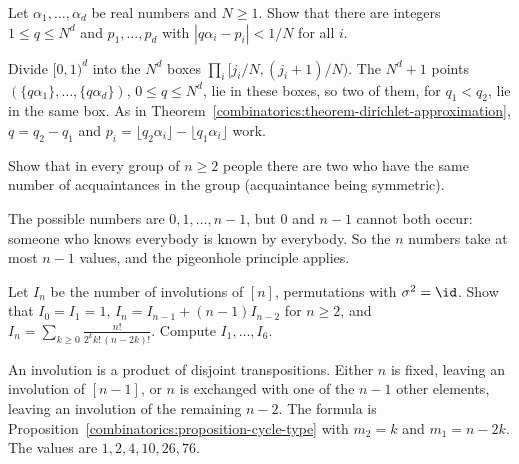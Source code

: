 \begin{exercise}\label{combinatorics:exercise-dirichlet-simultaneous}
Let $\alpha_1, \ldots, \alpha_d$ be real numbers and $N \geq 1$. Show that there are integers $1 \leq q \leq N^d$ and $p_1, \ldots, p_d$ with $|q\alpha_i - p_i| < 1/N$ for all $i$.
\end{exercise}

\begin{solution}
Divide $[0, 1)^d$ into the $N^d$ boxes $\prod_i[j_i/N, (j_i + 1)/N)$. The $N^d + 1$ points $(\{q\alpha_1\}, \ldots, \{q\alpha_d\})$, $0 \leq q \leq N^d$, lie in these boxes, so two of them, for
$q_1 < q_2$, lie in the same box. As in Theorem~\ref{combinatorics:theorem-dirichlet-approximation}, $q = q_2 - q_1$ and $p_i = \lfloor q_2\alpha_i \rfloor - \lfloor q_1\alpha_i \rfloor$ work.
\end{solution}

\begin{exercise}\label{combinatorics:exercise-equal-degrees}
Show that in every group of $n \geq 2$ people there are two who have the same number of acquaintances in the group (acquaintance being symmetric).
\end{exercise}

\begin{solution}
The possible numbers are $0, 1, \ldots, n - 1$, but $0$ and $n - 1$ cannot both occur: someone who knows everybody is known by everybody. So the $n$ numbers take at most $n - 1$ values, and the
pigeonhole principle applies.
\end{solution}

\begin{exercise}\label{combinatorics:exercise-involutions}
Let $I_n$ be the number of involutions of $[n]$, permutations with $\sigma^2 = \id$. Show that $I_0 = I_1 = 1$, $I_n = I_{n-1} + (n - 1)I_{n-2}$ for $n \geq 2$, and
$I_n = \sum_{k \geq 0}\frac{n!}{2^kk!\,(n - 2k)!}$. Compute $I_1, \ldots, I_6$.
\end{exercise}

\begin{solution}
An involution is a product of disjoint transpositions. Either $n$ is fixed, leaving an involution of $[n - 1]$, or $n$ is exchanged with one of the $n - 1$ other elements, leaving an involution of the
remaining $n - 2$. The formula is Proposition~\ref{combinatorics:proposition-cycle-type} with $m_2 = k$ and $m_1 = n - 2k$. The values are $1, 2, 4, 10, 26, 76$.
\end{solution}

